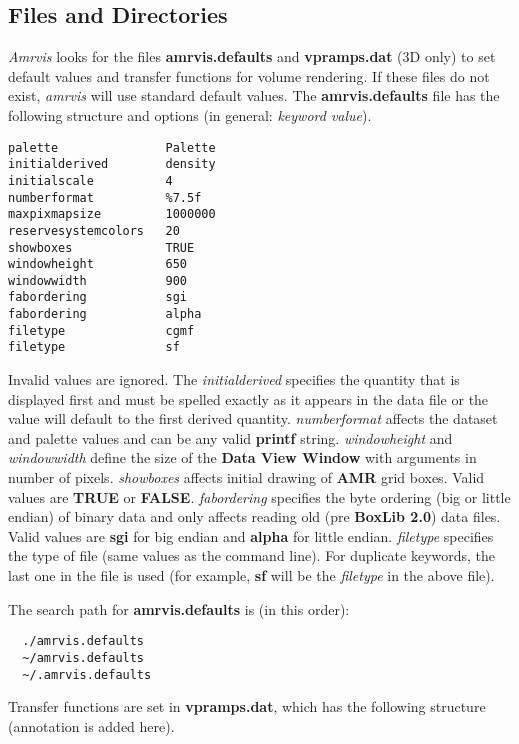 \subsection{Files and Directories}

{\em Amrvis} looks for the files {\bf amrvis.defaults} and
{\bf vpramps.dat} (3D only) to
set default values and transfer functions for volume rendering.
If these files do not exist, {\em amrvis} will use standard default values.
The {\bf amrvis.defaults} file has the following structure and options
(in general: {\em keyword   value}).


\begin{verbatim}
palette               Palette
initialderived        density
initialscale          4
numberformat          %7.5f
maxpixmapsize         1000000
reservesystemcolors   20
showboxes             TRUE
windowheight          650
windowwidth           900
fabordering           sgi
fabordering           alpha
filetype              cgmf
filetype              sf
\end{verbatim}


Invalid values are ignored.  The {\em initialderived} specifies the
quantity that is displayed first and must be spelled
exactly as it appears in the data file or the value will default to
the first derived quantity.  {\em numberformat} affects the dataset and
palette values and can be any valid {\bf printf} string.
{\em windowheight} and {\em windowwidth} define the size
of the {\bf Data View Window} with arguments in number of pixels.
{\em showboxes} affects initial drawing of {\bf AMR} grid boxes.  Valid
values are {\bf TRUE} or {\bf FALSE}.
{\em fabordering} specifies the byte ordering (big or little endian)
of binary data and only affects reading old (pre {\bf BoxLib 2.0}) data files.
Valid values are {\bf sgi} for big endian and {\bf alpha} for little endian.
{\em filetype} specifies the type of file (same values as the command line).
For duplicate keywords, the last one in the file is used (for example, {\bf sf}
will be the {\em filetype} in the above file).

The search path for {\bf amrvis.defaults} is (in this order):

\begin{verbatim}
  ./amrvis.defaults
  ~/amrvis.defaults
  ~/.amrvis.defaults
\end{verbatim}


Transfer functions are set in {\bf vpramps.dat}, which has the following structure
(annotation is added here).

